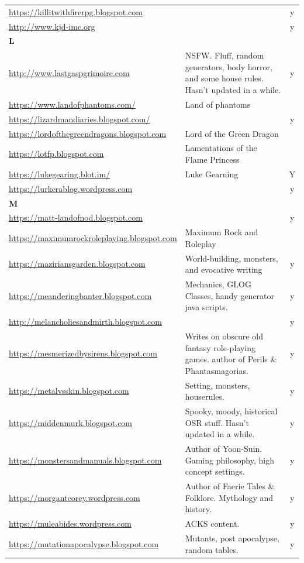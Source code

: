 \documentclass[a4paper, 11pt, twoside]{article}
\begin{document}
\begin{longtable}{p{6cm}p{8cm}c}
\url{https://killitwithfirerpg.blogspot.com} &  & y\\
\url{http://www.kjd-imc.org} &  & y\\
\textbf{L} &  & \\
\url{http://www.lastgaspgrimoire.com} & NSFW. Fluff, random generators, body horror, and some house rules. Hasn't updated in a while. & y\\
\url{https://www.landofphantoms.com/} & Land of phantoms & \\
\url{https://lizardmandiaries.blogspot.com/} &  & y\\
\url{https://lordofthegreendragons.blogspot.com} & Lord of the Green Dragon & \\
\url{https://lotfp.blogspot.com} & Lamentations of the Flame Princess & \\
\url{https://lukegearing.blot.im/} & Luke Gearning & Y\\
\url{https://lurkerablog.wordpress.com} &  & y\\
\textbf{M} &  & \\
\url{https://matt-landofnod.blogspot.com} &  & y\\
\url{https://maximumrockroleplaying.blogspot.com} & Maximum Rock and Roleplay & \\
\url{https://maziriansgarden.blogspot.com} & World-building, monsters, and evocative writing & y\\
\url{https://meanderingbanter.blogspot.com} & Mechanics, GLOG Classes, handy generator java scripts. & y\\
\url{http://melancholiesandmirth.blogspot.com} &  & y\\
\url{https://mesmerizedbysirens.blogspot.com} & Writes on obscure old fantasy role-playing games. author of Perils \& Phantasmagorias. & y\\
\url{https://metalvsskin.blogspot.com} & Setting, monsters, houserules. & y\\
\url{https://middenmurk.blogspot.com} & Spooky, moody, historical OSR stuff. Hasn't updated in a while. & y\\
\url{https://monstersandmanuals.blogspot.com} & Author of Yoon-Suin. Gaming philosophy, high concept settings. & y\\
\url{https://morgantcorey.wordpress.com} & Author of Faerie Tales \& Folklore. Mythology and history. & y\\
\url{https://muleabides.wordpress.com} & ACKS content. & y\\
\url{https://mutationapocalypse.blogspot.com} & Mutants, post apocalypse, random tables. & y\\

\end{longtable}
\end{document}
